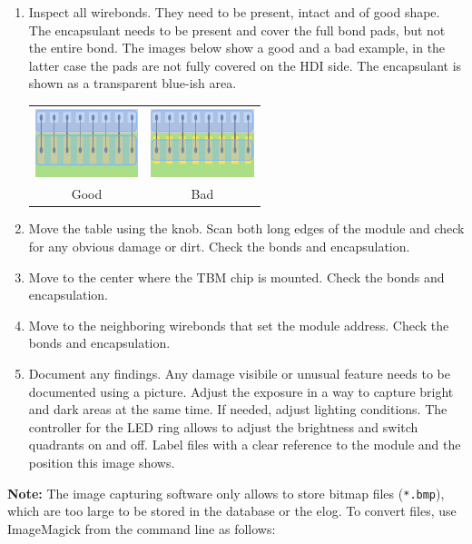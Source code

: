 \documentclass[12pt]{unlsilabsop}
\begin{document}
\begin{enumerate}
    \item Inspect all wirebonds. They need to be present, intact and of good shape. The encapsulant needs to be present and cover the full bond pads, but not the entire bond. The images below show a good and a bad example, in the latter case the pads are not fully covered on the HDI side. The encapsulant is shown as a transparent blue-ish area.

    \begin{center}
        \begin{tabular}{cc}
        \includegraphics[width=3cm]{img/PottingGood.pdf} & \includegraphics[width=3cm]{img/PottingBad.pdf} \\
        Good & Bad \\
        \end{tabular}
    \end{center}

    \item Move the table using the knob. Scan both long edges of the module and check for any obvious damage or dirt. Check the bonds and encapsulation.
    \item Move to the center where the TBM chip is mounted. Check the bonds and encapsulation.
    \item Move to the neighboring wirebonds that set the module address. Check the bonds and encapsulation.
    \item Document any findings. Any damage visibile or unusual feature needs to be documented using a picture. Adjust the exposure in a way to capture bright and dark areas at the same time. If needed, adjust lighting conditions. The controller for the LED ring allows to adjust the brightness and switch quadrants on and off. Label files with a clear reference to the module and the position this image shows.
\end{enumerate}
\textbf{Note:} The image capturing software only allows to store bitmap files (\texttt{*.bmp}), which are too large to be stored in the database or the elog. To convert files, use ImageMagick from the command line as follows:
\end{document}
